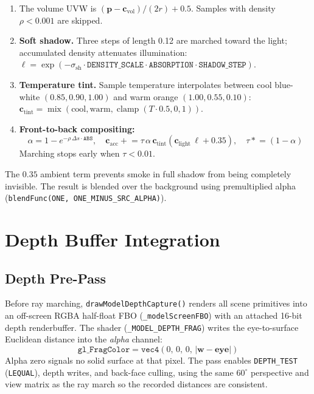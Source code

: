 \documentclass[a4paper, 12pt]{article}
\begin{document}
\begin{enumerate}[nosep]
\item The volume UVW is $(\mathbf{p}-\mathbf{c}_{\text{vol}})/(2r)+0.5$.
      Samples with density $\rho<0.001$ are skipped.

\item \textbf{Soft shadow.}
      Three steps of length 0.12 are marched toward the light; accumulated
      density attenuates illumination:
      $\ell = \exp(-\sigma_{\text{sh}}\cdot\texttt{DENSITY\_SCALE}\cdot
      \texttt{ABSORPTION}\cdot\texttt{SHADOW\_STEP})$.

\item \textbf{Temperature tint.}
      Sample temperature interpolates between cool blue-white
      $(0.85,0.90,1.00)$ and warm orange $(1.00,0.55,0.10)$:
      $\mathbf{c}_{\text{tint}}=\operatorname{mix}(\text{cool},\text{warm},
      \operatorname{clamp}(T\cdot0.5,0,1))$.

\item \textbf{Front-to-back compositing:}
      \[
        \alpha = 1-e^{-\rho\,\Delta s\cdot\texttt{ABS}},\quad
        \mathbf{c}_{\text{acc}} \mathrel{+}= \tau\,\alpha\,
          \mathbf{c}_{\text{tint}}(\mathbf{c}_{\text{light}}\,\ell+0.35),\quad
        \tau \mathrel{*}= (1-\alpha)
      \]
      Marching stops early when $\tau<0.01$.
\end{enumerate}

The $0.35$ ambient term prevents smoke in full shadow from being completely
invisible.
The result is blended over the background using premultiplied alpha
(\texttt{blendFunc(ONE,\allowbreak\ ONE\_MINUS\_SRC\_ALPHA)}).

\section{Depth Buffer Integration}

\subsection{Depth Pre-Pass}

Before ray marching, \texttt{drawModelDepthCapture()} renders all scene
primitives into an off-screen RGBA half-float FBO (\texttt{\_modelScreenFBO})
with an attached 16-bit depth renderbuffer.
The shader (\texttt{\_MODEL\_DEPTH\_FRAG}) writes the eye-to-surface Euclidean
distance into the \emph{alpha} channel:
\[
  \texttt{gl\_FragColor} = \texttt{vec4}(0,\,0,\,0,\,|\mathbf{w}-\mathbf{eye}|)
\]
Alpha zero signals no solid surface at that pixel.
The pass enables \texttt{DEPTH\_TEST} (\texttt{LEQUAL}), depth writes, and
back-face culling, using the same $60^\circ$ perspective and view matrix as
the ray march so the recorded distances are consistent.
\end{document}
